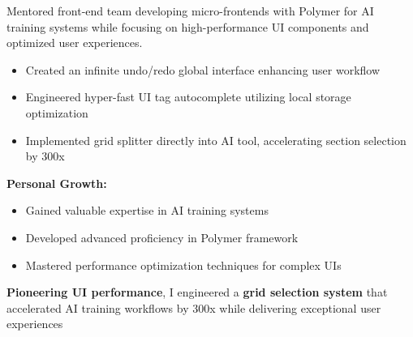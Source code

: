 \documentclass[a4paper,10pt]{article}
\begin{document}
\begin{minipage}{\textwidth}
    Mentored front-end team developing micro-frontends with Polymer for AI training systems while focusing on high-performance UI components and optimized user experiences.

	\vspace{0.2cm}
	\begin{itemize}[label=\textcolor{darkblue}{\textbullet}, leftmargin=*, nosep]
		\item Created an infinite undo/redo global interface enhancing user workflow
		\item Engineered hyper-fast UI tag autocomplete utilizing local storage optimization
		\item Implemented grid splitter directly into AI tool, accelerating section selection by 300x
	\end{itemize}

	\vspace{0.2cm}
	\textbf{Personal Growth:}
	\vspace{0.2cm}
	\begin{itemize}[label=\textcolor{darkblue}{\textbullet}, leftmargin=*, nosep]
		\item Gained valuable expertise in AI training systems
		\item Developed advanced proficiency in Polymer framework
		\item Mastered performance optimization techniques for complex UIs
	\end{itemize}

    \vspace{0.2cm}

    \textbf{Pioneering UI performance}, I engineered a \textbf{grid selection system} that accelerated AI training workflows by 300x while delivering exceptional user experiences

	\vspace{0.4cm}

	\vspace{0.4cm}

\end{minipage}
\end{document}
